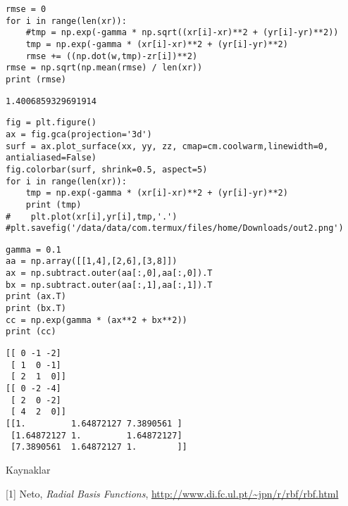 \documentclass[12pt,fleqn]{article}\usepackage{../../common}
\begin{document}
\begin{verbatim}
rmse = 0
for i in range(len(xr)):
    #tmp = np.exp(-gamma * np.sqrt((xr[i]-xr)**2 + (yr[i]-yr)**2))
    tmp = np.exp(-gamma * (xr[i]-xr)**2 + (yr[i]-yr)**2)
    rmse += ((np.dot(w,tmp)-zr[i])**2)
rmse = np.sqrt(np.mean(rmse) / len(xr))
print (rmse)
\end{verbatim}

\begin{verbatim}
1.4006859329691914
\end{verbatim}



\begin{verbatim}
fig = plt.figure()
ax = fig.gca(projection='3d')
surf = ax.plot_surface(xx, yy, zz, cmap=cm.coolwarm,linewidth=0, antialiased=False)
fig.colorbar(surf, shrink=0.5, aspect=5)
for i in range(len(xr)):
    tmp = np.exp(-gamma * (xr[i]-xr)**2 + (yr[i]-yr)**2)
    print (tmp)
#    plt.plot(xr[i],yr[i],tmp,'.')
#plt.savefig('/data/data/com.termux/files/home/Downloads/out2.png')
\end{verbatim}














\begin{verbatim}
gamma = 0.1
aa = np.array([[1,4],[2,6],[3,8]])
ax = np.subtract.outer(aa[:,0],aa[:,0]).T
bx = np.subtract.outer(aa[:,1],aa[:,1]).T
print (ax.T)
print (bx.T)
cc = np.exp(gamma * (ax**2 + bx**2))
print (cc)
\end{verbatim}

\begin{verbatim}
[[ 0 -1 -2]
 [ 1  0 -1]
 [ 2  1  0]]
[[ 0 -2 -4]
 [ 2  0 -2]
 [ 4  2  0]]
[[1.         1.64872127 7.3890561 ]
 [1.64872127 1.         1.64872127]
 [7.3890561  1.64872127 1.        ]]
\end{verbatim}














Kaynaklar

[1] Neto, {\em Radial Basis Functions}, \url{http://www.di.fc.ul.pt/~jpn/r/rbf/rbf.html}
\end{document}

